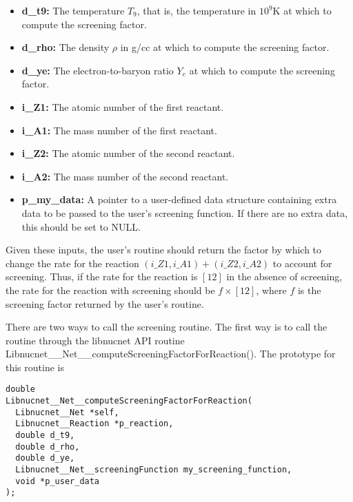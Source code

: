 \documentclass{article}    %
\begin{document}
\begin{itemize}

\item {\bf d\_t9:} The temperature $T_9$, that is, the temperature
in $10^9$K at which to compute the screening factor.

\item {\bf d\_rho:} The density $\rho$ in g/cc at which to compute the screening
factor.

\item {\bf d\_ye:} The electron-to-baryon ratio $Y_e$ at which to compute the
screening factor.

\item {\bf i\_Z1:}  The atomic number of the first reactant.

\item {\bf i\_A1:}  The mass number of the first reactant.

\item {\bf i\_Z2:}  The atomic number of the second reactant.

\item {\bf i\_A2:}  The mass number of the second reactant.

\item {\bf p\_my\_data:}  A pointer to a user-defined data structure containing
extra data to be passed to the user's screening function.  If there are
no extra data, this should be set to NULL.

\end{itemize}

Given these inputs, the user's routine should return the factor by which
to change the rate for the reaction $(i\_Z1,i\_A1) + (i\_Z2,i\_A2)$ to
account for screening.  Thus, if the rate for the reaction is $[12]$ in the
absence of screening, the rate for the reaction with screening should be
$f \times [12]$, where $f$ is the screening factor returned by
the user's routine.

There are two ways to call the screening routine.  The first way is to
call the routine through the libnucnet API routine
Libnucnet\_\_Net\_\_computeScreeningFactorForReaction().  The prototype
for this routine is

\begin{verbatim}
double
Libnucnet__Net__computeScreeningFactorForReaction(
  Libnucnet__Net *self,
  Libnucnet__Reaction *p_reaction,
  double d_t9,
  double d_rho,
  double d_ye,
  Libnucnet__Net__screeningFunction my_screening_function,
  void *p_user_data
);
\end{verbatim}
\end{document}

